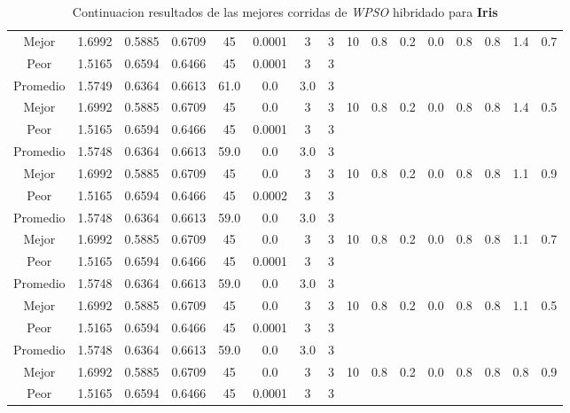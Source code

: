 \begin{table}[h!]
\begin{center}
\begin{tabular}{|c|c|c|c|c|c|c|c|c|c|c|c|c|c|c|c|}
            \cline{1-8}
            Mejor & 1.6992 & 0.5885  & 0.6709 & 45 & 0.0001 & 3 & 3 & 10 & 0.8 & 0.2 & 0.0 & 0.8 & 0.8 & 1.4 & 0.7\\
            \cline{1-8}
            Peor & 1.5165 & 0.6594  & 0.6466 & 45 & 0.0001 & 3 & 3 &  &  &  &  &  &  &  & \\
        \hline
        \hline
            Promedio  & 1.5749 & 0.6364 & 0.6613 & 61.0 & 0.0 & 3.0 & 3 &  &  &  &  &  &  &  & \\
            \cline{1-8}
            Mejor & 1.6992 & 0.5885  & 0.6709 & 45 & 0.0 & 3 & 3 & 10 & 0.8 & 0.2 & 0.0 & 0.8 & 0.8 & 1.4 & 0.5\\
            \cline{1-8}
            Peor & 1.5165 & 0.6594  & 0.6466 & 45 & 0.0001 & 3 & 3 &  &  &  &  &  &  &  & \\
        \hline
        \hline
            Promedio  & 1.5748 & 0.6364 & 0.6613 & 59.0 & 0.0 & 3.0 & 3 &  &  &  &  &  &  &  & \\
            \cline{1-8}
            Mejor & 1.6992 & 0.5885  & 0.6709 & 45 & 0.0 & 3 & 3 & 10 & 0.8 & 0.2 & 0.0 & 0.8 & 0.8 & 1.1 & 0.9\\
            \cline{1-8}
            Peor & 1.5165 & 0.6594  & 0.6466 & 45 & 0.0002 & 3 & 3 &  &  &  &  &  &  &  & \\
        \hline
        \hline
            Promedio  & 1.5748 & 0.6364 & 0.6613 & 59.0 & 0.0 & 3.0 & 3 &  &  &  &  &  &  &  & \\
            \cline{1-8}
            Mejor & 1.6992 & 0.5885  & 0.6709 & 45 & 0.0 & 3 & 3 & 10 & 0.8 & 0.2 & 0.0 & 0.8 & 0.8 & 1.1 & 0.7\\
            \cline{1-8}
            Peor & 1.5165 & 0.6594  & 0.6466 & 45 & 0.0001 & 3 & 3 &  &  &  &  &  &  &  & \\
        \hline
        \hline
            Promedio  & 1.5748 & 0.6364 & 0.6613 & 59.0 & 0.0 & 3.0 & 3 &  &  &  &  &  &  &  & \\
            \cline{1-8}
            Mejor & 1.6992 & 0.5885  & 0.6709 & 45 & 0.0 & 3 & 3 & 10 & 0.8 & 0.2 & 0.0 & 0.8 & 0.8 & 1.1 & 0.5\\
            \cline{1-8}
            Peor & 1.5165 & 0.6594  & 0.6466 & 45 & 0.0001 & 3 & 3 &  &  &  &  &  &  &  & \\
        \hline
        \hline
            Promedio  & 1.5748 & 0.6364 & 0.6613 & 59.0 & 0.0 & 3.0 & 3 &  &  &  &  &  &  &  & \\
            \cline{1-8}
            Mejor & 1.6992 & 0.5885  & 0.6709 & 45 & 0.0 & 3 & 3 & 10 & 0.8 & 0.2 & 0.0 & 0.8 & 0.8 & 0.8 & 0.9\\
            \cline{1-8}
            Peor & 1.5165 & 0.6594  & 0.6466 & 45 & 0.0001 & 3 & 3 &  &  &  &  &  &  &  & \\
        \hline
        \end{tabular}
        \caption{Continuacion resultados de las mejores corridas de \emph{WPSO} hibridado para {\bf Iris}}
        \label{tb:tablewpsohibcsvc}
    \end{center}
\end{table}
